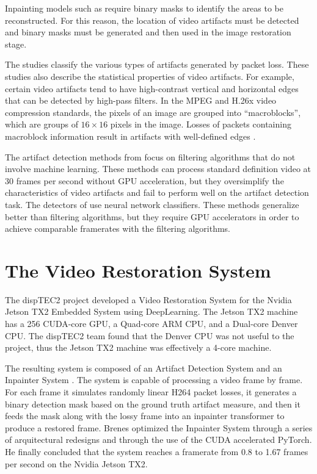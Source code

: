 Inpainting models such as \cite{Li2022,Brenes2022} require binary masks to identify the areas to be reconstructed. For this reason, the location of video artifacts must be detected and binary masks must be generated and then used in the image restoration stage.

The studies \cite{Greengrass2009, Glavota2016} classify the various types of artifacts generated by packet loss. These studies also describe the statistical properties of video artifacts. For example, certain video artifacts tend to have high-contrast vertical and horizontal edges that can be detected by high-pass filters. In the MPEG and H.26x video compression standards, the pixels of an image are grouped into ``macroblocks'', which are groups of $16 \times 16$ pixels in the image. Losses of packets containing macroblock information result in artifacts with well-defined edges \cite{Vranjes2019, Glavota2018}.

The artifact detection methods from \cite{Vranjes2018, Glavota2018} focus on filtering algorithms that do not involve machine learning. These methods can process standard definition video at 30 frames per second without GPU acceleration, but they oversimplify the characteristics of video artifacts and fail to perform well on the artifact detection task. The detectors of \cite{Goodall2019, Rajasekar2020} use neural network classifiers. These methods generalize better than filtering algorithms, but they require GPU accelerators in order to achieve comparable framerates with the filtering algorithms.

\section{The Video Restoration System}
\label{sec:intro_disptec}

The dispTEC2 project developed a Video Restoration System for the Nvidia Jetson TX2 Embedded System using DeepLearning. The Jetson TX2 machine has a 256 CUDA-core GPU, a Quad-core ARM CPU, and a Dual-core Denver CPU. The dispTEC2 team found that the Denver CPU was not useful to the project, thus the Jetson TX2 machine was effectively a 4-core machine.

The resulting system is composed of an Artifact Detection System and an Inpainter System \cite{Brenes2022}. The system is capable of processing a video frame by frame. For each frame it simulates randomly linear H264 packet losses, it generates a binary detection mask based on the ground truth artifact measure, and then it feeds the mask along with the lossy frame into an inpainter transformer to produce a restored frame. Brenes \cite{Brenes2022} optimized the Inpainter System through a series of arquitectural redesigns and through the use of the CUDA accelerated PyTorch. He finally concluded that the system reaches a framerate from 0.8 to 1.67 frames per second on the Nvidia Jetson TX2.

